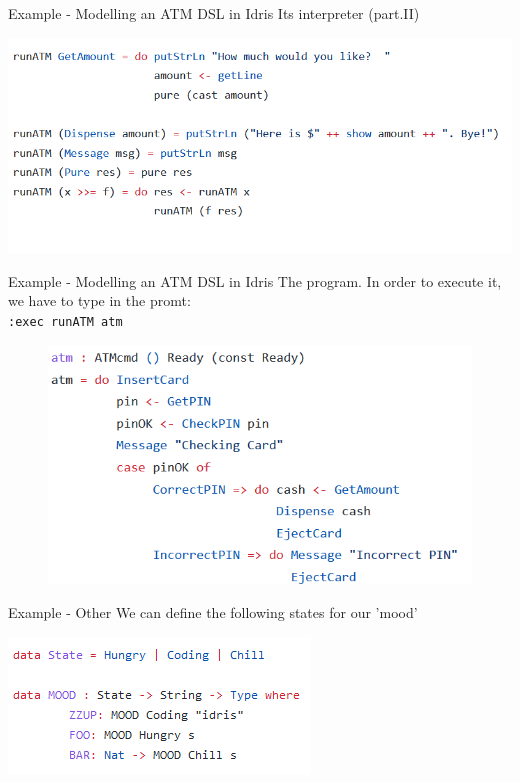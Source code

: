 \documentclass{beamer}
\newcommand{\dsltitle}{Example - Modelling an ATM DSL in Idris}
\newcommand{\othertitle}{Example - Other}
\begin{document}
\begin{frame}[fragile]{\dsltitle}
Its interpreter (part.II)
\begin{center}
	\includegraphics[width=\textwidth]{pics/dsl-code-4_2}
\end{center}
\end{frame}

\begin{frame}[fragile]{\dsltitle}
The program. In order to execute it, we have to type in the promt:\\
\texttt{:exec runATM atm}
\begin{figure}
	\raggedright
  \includegraphics[scale=0.5]{pics/dsl-code-5}
\end{figure}
\end{frame}

\begin{frame}[fragile]{\othertitle}
We can define the following states for our 'mood'
\begin{center}
	\includegraphics[scale=0.8]{pics/random-code-1}
\end{center}
\end{frame}
\end{document}
